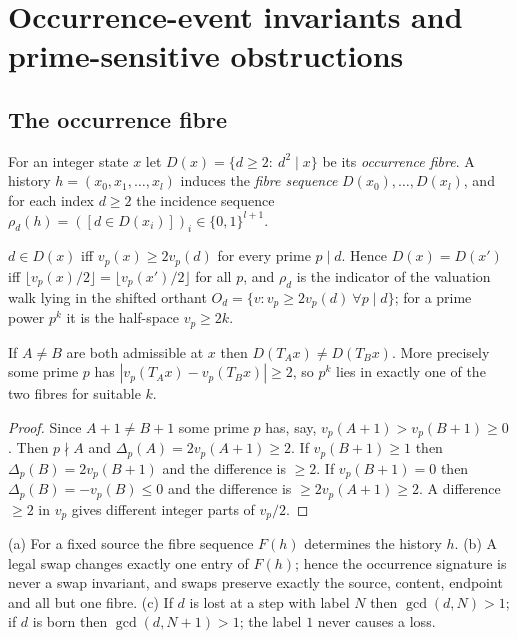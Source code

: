 \section{Occurrence-event invariants and prime-sensitive obstructions}\label{sec:events}
\subsection{The occurrence fibre}
For an integer state $x$ let $D(x)=\{d\ge2:\ d^2\mid x\}$ be its \emph{occurrence fibre}. A history $h=(x_0,x_1,\dots,x_l)$ induces the \emph{fibre sequence} $D(x_0),\dots,D(x_l)$, and for each index $d\ge2$ the incidence sequence $\rho_d(h)=([d\in D(x_i)])_{i}\in\{0,1\}^{l+1}$.
\begin{lemma}\label{lem:orthant}
$d\in D(x)$ iff $v_p(x)\ge2v_p(d)$ for every prime $p\mid d$. Hence $D(x)=D(x')$ iff $\lfloor v_p(x)/2\rfloor=\lfloor v_p(x')/2\rfloor$ for all $p$, and $\rho_d$ is the indicator of the valuation walk lying in the shifted orthant $O_d=\{v:v_p\ge2v_p(d)\ \forall p\mid d\}$; for a prime power $p^k$ it is the half-space $v_p\ge2k$.
\end{lemma}
\begin{lemma}\label{lem:L}
If $A\ne B$ are both admissible at $x$ then $D(T_Ax)\ne D(T_Bx)$. More precisely some prime $p$ has $|v_p(T_Ax)-v_p(T_Bx)|\ge2$, so $p^k$ lies in exactly one of the two fibres for suitable $k$.
\end{lemma}
\begin{proof}
Since $A+1\ne B+1$ some prime $p$ has, say, $v_p(A+1)>v_p(B+1)\ge0$. Then $p\nmid A$ and $\Delta_p(A)=2v_p(A+1)\ge2$. If $v_p(B+1)\ge1$ then $\Delta_p(B)=2v_p(B+1)$ and the difference is $\ge2$. If $v_p(B+1)=0$ then $\Delta_p(B)=-v_p(B)\le0$ and the difference is $\ge2v_p(A+1)\ge2$. A difference $\ge2$ in $v_p$ gives different integer parts of $v_p/2$.
\end{proof}
\begin{theorem}\label{thm:faith}
(a) For a fixed source the fibre sequence $F(h)$ determines the history $h$. (b) A legal swap changes exactly one entry of $F(h)$; hence the occurrence signature is never a swap invariant, and swaps preserve exactly the source, content, endpoint and all but one fibre. (c) If $d$ is lost at a step with label $N$ then $\gcd(d,N)>1$; if $d$ is born then $\gcd(d,N+1)>1$; the label $1$ never causes a loss.
\end{theorem}
